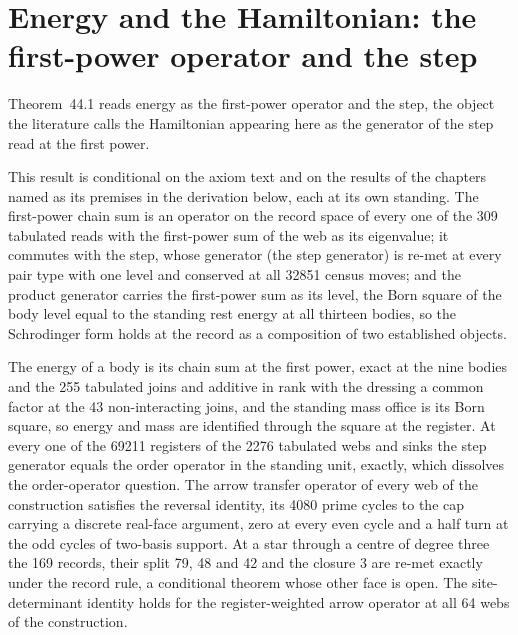 \section{Energy and the Hamiltonian: the first-power operator and the step}\label{mod:II-6-energy-and-the-hamiltonian-the-first-power-operator-and-the-step}
\label{narr:open:2-6}Theorem~44.1 reads energy as the first-power operator and the step, the object the literature calls the Hamiltonian appearing here as the generator of the step read at the first power.
\begin{chconditional}\label{box:II-6-energy-and-the-hamiltonian-the-first-power-operator-and-the-step:1}
This result is conditional on the axiom text and on the results of the chapters named as its premises in the derivation below, each at its own standing.
The first-power chain sum is an operator on the record space of every one of the 309 tabulated reads with the first-power sum of the web as its eigenvalue; it commutes with the step, whose generator (the step generator) is re-met at every pair type with one level and conserved at all 32851 census moves; and the product generator carries the first-power sum as its level, the Born square of the body level equal to the standing rest energy at all thirteen bodies, so the Schrodinger form holds at the record as a composition of two established objects.
\end{chconditional}
The energy of a body is its chain sum at the first power, exact at the nine bodies and the 255 tabulated joins and additive in rank with the dressing a common factor at the 43 non-interacting joins, and the standing mass office is its Born square, so energy and mass are identified through the square at the register.
At every one of the 69211 registers of the 2276 tabulated webs and sinks the step generator equals the order operator in the standing unit, exactly, which dissolves the order-operator question.
The arrow transfer operator of every web of the construction satisfies the reversal identity, its 4080 prime cycles to the cap carrying a discrete real-face argument, zero at every even cycle and a half turn at the odd cycles of two-basis support. At a star through a centre of degree three the 169 records, their split 79, 48 and 42 and the closure 3 are re-met exactly under the record rule, a conditional theorem whose other face is open. The site-determinant identity holds for the register-weighted arrow operator at all 64 webs of the construction.
